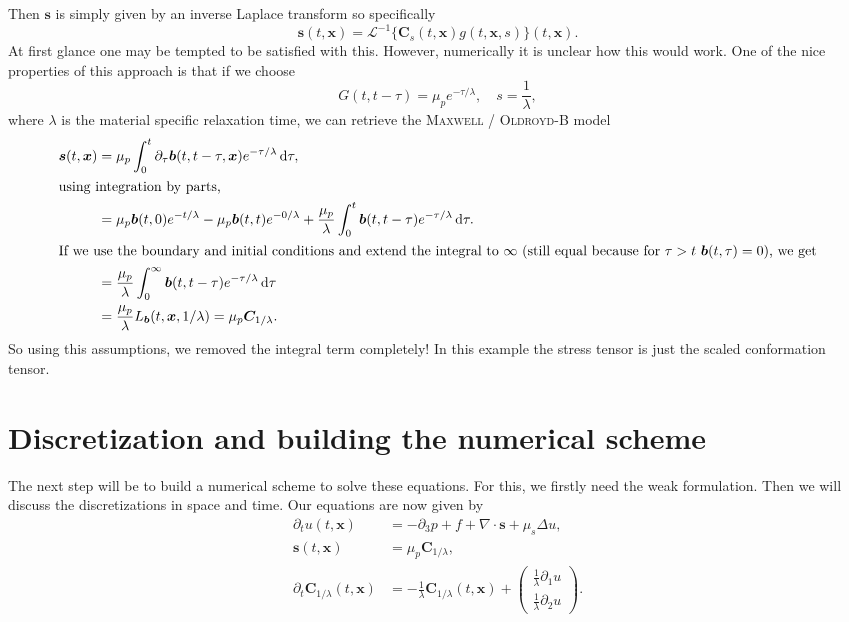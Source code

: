 \documentclass[12pt,a4paper,twoside, open=right]{scrreprt}
\theoremstyle{definition}
\theoremstyle{plain}
\newcommand{\bfb}{\bm{b}}
\newcommand{\bfs}{\bm{s}}
\newcommand{\bfC}{\bm{C}}
\newcommand{\bfx}{\bm{x}}
\newcommand{\D}{\mathop{}\!\mathrm{d}}
\begin{document}
Then $\bfs$ is simply given by an inverse Laplace transform so specifically
\begin{equation}
    \bfs(t,\bfx) =\mathcal{L}^{-1}\{\bfC_s(t,\bfx)g(t,\bfx,s)\}(t,\bfx).
\end{equation}
At first glance one may be tempted to be satisfied with this. However, numerically it is unclear how this would work. One of the nice properties of this approach is that if we choose 
\begin{equation}
    G(t,t-\tau)= \mu_p e^{-\tau/\lambda},\quad s=\frac{1}{\lambda},
\end{equation}
where $\lambda$ is the material specific relaxation time, we can retrieve the \textsc{Maxwell} / \textsc{Oldroyd}-B model 
\begin{align}
    \bfs(t,\bfx)&=\mu_p\int_0^t\partial_\tau\bfb(t,t-\tau,\bfx)e^{-\tau/\lambda}\D\tau,\\
    \intertext{using integration by parts,}
    &=\mu_p\bfb(t,0)e^{-t/\lambda}-\mu_p\bfb(t,t)e^{-0/\lambda}+\frac{\mu_p}{\lambda}\int_0^t\bfb(t,t-\tau)e^{-\tau/\lambda}\D\tau.\\
    \intertext{If we use the boundary and initial conditions and extend the integral to $\infty$ (still equal because for $\tau>t$ $\bfb(t,\tau)=0$), we get}
    &=\frac{\mu_p}{\lambda}\int_0^\infty\bfb(t,t-\tau)e^{-\tau/\lambda}\D\tau\\
    &=\frac{\mu_p}{\lambda}L_{\bfb}(t,\bfx,1/\lambda) = \mu_p\bfC_{1/\lambda}.
\end{align}
So using this assumptions, we removed the integral term completely! In this example the stress tensor is just the scaled conformation tensor. 
\chapter{Discretization and building the numerical scheme}
The next step will be to build a numerical scheme to solve these equations. For this, we firstly need the weak formulation. Then we will discuss the discretizations in space and time. Our equations are now given by 
\begin{align}
    \label{eq:transfeq1}
    \partial_t u(t,\bfx) &= -\partial_3 p + f +\nabla\cdot \bfs+\mu_s\Delta u,\\
    \label{eq:transfeq2}
    \bfs(t,\bfx)&=\mu_p\bfC_{1/\lambda},\\
    \partial_t\bfC_{1/\lambda}(t,\bfx) &= -\frac{1}{\lambda}\bfC_{1/\lambda}(t,\bfx)+\begin{pmatrix}
    \frac{1}{\lambda}\partial_1u\\\frac{1}{\lambda}\partial_2 u
    \end{pmatrix}.
    \label{eq:transfeq3}
\end{align}
\end{document}
